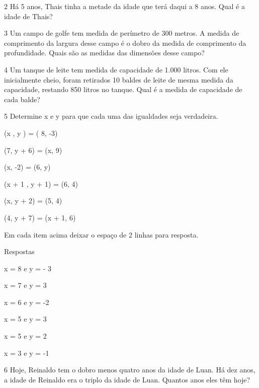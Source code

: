{\num{2} Há 5 anos, Thais tinha a metade da idade que terá daqui a 8 anos.
Qual é a idade de Thais?


\num{3} Um campo de golfe tem medida de perímetro de 300 metros. A medida de
comprimento da largura desse campo é o dobro da medida de comprimento da
profundidade. Quais são as medidas das dimensões desse campo?


\num{4} Um tanque de leite tem medida de capacidade de 1.000 litros. Com ele
inicialmente cheio, foram retirados 10 baldes de leite de mesma medida
da capacidade, restando 850 litros no tanque. Qual é a medida de
capacidade de cada balde?


\num{5} Determine x e y para que cada uma das igualdades seja verdadeira.
\item (x , y ) = ( 8, -3)
\item (7, y + 6) = (x, 9)
\item (x, -2) = (6, y)
\item (x + 1 , y + 1) = (6, 4)
\item (x, y + 2) = (5, 4)
\item (4, y + 7) = (x + 1, 6)

Em cada item acima deixar o espaço de 2 linhas para resposta.

Respostas
\item x = 8 e y = - 3
\item x = 7 e y = 3
\item x = 6 e y = -2
\item x = 5 e y = 3
\item x = 5 e y = 2
\item x = 3 e y = -1

\num{6} Hoje, Reinaldo tem o dobro menos quatro anos da idade de Luan. Há dez
anos, a idade de Reinaldo era o triplo da idade de Luan. Quantos anos
eles têm hoje?


}
